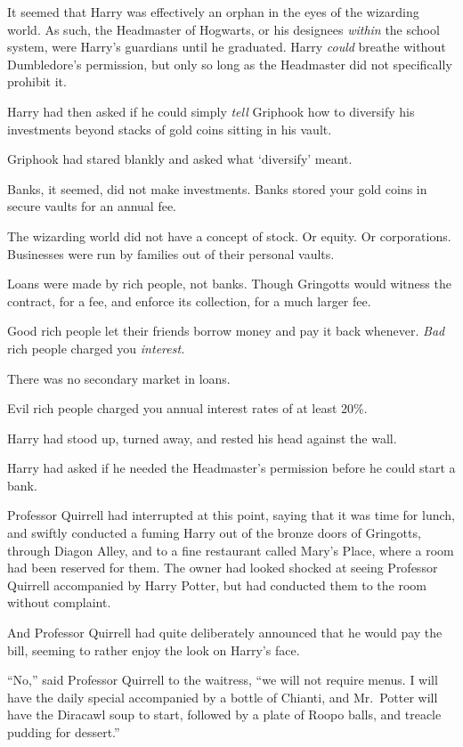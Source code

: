It seemed that Harry was effectively an orphan in the eyes of the
wizarding world. As such, the Headmaster of Hogwarts, or his designees
\emph{within} the school system, were Harry's guardians until he
graduated. Harry \emph{could} breathe without Dumbledore's permission,
but only so long as the Headmaster did not specifically prohibit it.

Harry had then asked if he could simply \emph{tell} Griphook how to
diversify his investments beyond stacks of gold coins sitting in his
vault.

Griphook had stared blankly and asked what `diversify' meant.

Banks, it seemed, did not make investments. Banks stored your gold coins
in secure vaults for an annual fee.

The wizarding world did not have a concept of stock. Or equity. Or
corporations. Businesses were run by families out of their personal
vaults.

Loans were made by rich people, not banks. Though Gringotts would
witness the contract, for a fee, and enforce its collection, for a much
larger fee.

Good rich people let their friends borrow money and pay it back
whenever. \emph{Bad} rich people charged you \emph{interest.}

There was no secondary market in loans.

Evil rich people charged you annual interest rates of at least 20\%.

Harry had stood up, turned away, and rested his head against the wall.

Harry had asked if he needed the Headmaster's permission before he could
start a bank.

Professor Quirrell had interrupted at this point, saying that it was
time for lunch, and swiftly conducted a fuming Harry out of the bronze
doors of Gringotts, through Diagon Alley, and to a fine restaurant
called Mary's Place, where a room had been reserved for them. The owner
had looked shocked at seeing Professor Quirrell accompanied by Harry
Potter, but had conducted them to the room without complaint.

And Professor Quirrell had quite deliberately announced that he would
pay the bill, seeming to rather enjoy the look on Harry's face.

``No,'' said Professor Quirrell to the waitress, ``we will not require
menus. I will have the daily special accompanied by a bottle of Chianti,
and Mr.~Potter will have the Diracawl soup to start, followed by a plate
of Roopo balls, and treacle pudding for dessert.''

